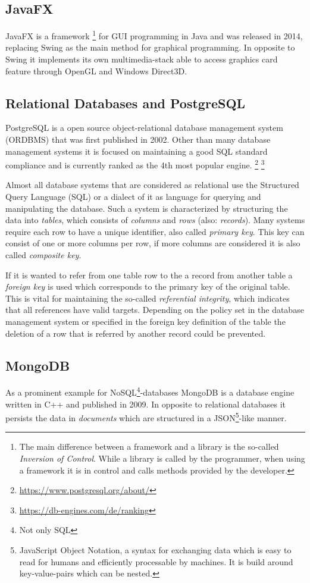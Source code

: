 \subsection{JavaFX}
\label{sec:javafx}
JavaFX is a framework \footnote{The main difference between a framework and a library is the so-called \emph{Inversion of Control}. While a library is called by the programmer, when using a framework it is in control and calls methods provided by the developer.} for GUI programming in Java and was released in 2014, replacing Swing as the main method for graphical programming. In opposite to Swing it implements its own multimedia-stack able to access graphics card feature through OpenGL and Windows Direct3D.  

\subsection{Relational Databases and PostgreSQL}
\label{sec:postgres}
PostgreSQL is a open source object-relational database management system (ORDBMS) that was first published in 2002. Other than many database management systems it is focused on maintaining a good SQL standard compliance and is currently ranked as the 4th most popular engine. \footnote{ \href{https://www.postgresql.org/about/}{https://www.postgresql.org/about/}} \footnote{\href{https://db-engines.com/de/ranking}{https://db-engines.com/de/ranking}}

Almost all database systems that are considered as relational use the Structured Query Language (SQL) or a dialect of it as language for querying and manipulating the database. Such a system is characterized by structuring the data into \emph{tables}, which consists of \emph{columns} and \emph{rows} (also: \emph{records}). Many systems require each row to have a unique identifier, also called \emph{primary key}. This key can consist of one or more columns per row, if more columns are considered it is also called \emph{composite key}. 

If it is wanted to refer from one table row to the a record from another table a \emph{foreign key} is used which corresponds to the primary key of the original table. This is vital for maintaining the so-called \emph{referential integrity}, which indicates that all references have valid targets. Depending on the policy set in the database management system or specified in the foreign key definition of the table the deletion of a row that is referred by another record could be prevented.


\subsection{MongoDB}
\label{sec:mongodb}
As a prominent example for NoSQL\footnote{Not only SQL}-databases MongoDB is a database engine written in C++ and published in 2009. In opposite to relational databases it persists the data in \emph{documents} which are structured in a JSON\footnote{JavaScript Object Notation, a syntax for exchanging data which is easy to read for humans and efficiently processable by machines. It is build around key-value-pairs which can be nested.}-like manner. 

